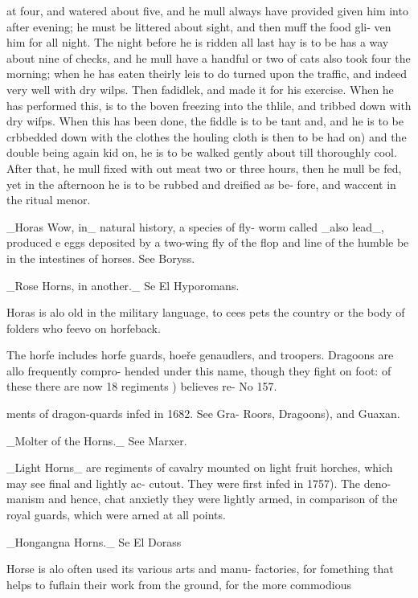 at four, and watered about five, and he mull always
have provided given him into after evening; he must be
littered about sight, and then muff the food gli-
ven him for all night. The night before he is ridden
all last hay is to be has a way about nine of checks, and
he mull have a handful or two of cats also took four
the morning; when he has eaten theirly leis to do
turned upon the traffic, and indeed very well with dry
wilps. Then fadidlek, and made it for his exercise.
When he has performed this, is to the boven
freezing into the thlile, and tribbed down with dry
wifps. When this has been done, the fiddle is to be
tant and, and he is to be crbbedded down with the clothes
the houling cloth is then to be had on) and the double
being again kid on, he is to be walked gently about
till thoroughly cool. After that, he mull fixed with
out meat two or three hours, then he mull be fed, yet
in the afternoon he is to be rubbed and dreified as be-
fore, and waccent in the ritual menor.\par\medskip
\_Horas Wow, in\_ natural history, a species of fly-
worm called \_also lead\_, produced e eggs deposited by a
two-wing fly of the flop and line of the humble
be in the intestines of horses. See Boryss.\par\medskip
\_Rose Horns, in another.\_ Se El Hyporomans.\par\medskip
Horas is alo old in the military language, to cees
pets the country or the body of folders who feevo on
horfeback.\par\medskip
The horfe includes horfe guards, hoeře genaudlers,
and troopers. Dragoons are allo frequently compro-
hended under this name, though they fight on foot:
of these there are now 18 regiments ) believes re-
No 157.\par\medskip
ments of dragon-quards infed in 1682. See Gra-
Roors, Dragoons), and Guaxan.\par\medskip
\_Molter of the Horns.\_ See Marxer.\par\medskip
\_Light Horns\_ are regiments of cavalry mounted on
light fruit horches, which may see final and lightly ac-
cutout. They were first infed in 1757). The deno-
manism and hence, chat anxietly they were lightly
armed, in comparison of the royal guards, which were
arned at all points.\par\medskip
\_Hongangna Horns.\_ Se El Dorass\par\medskip
Horse is alo often used its various arts and manu-
factories, for fomething that helps to fuflain their
work from the ground, for the more commodious
